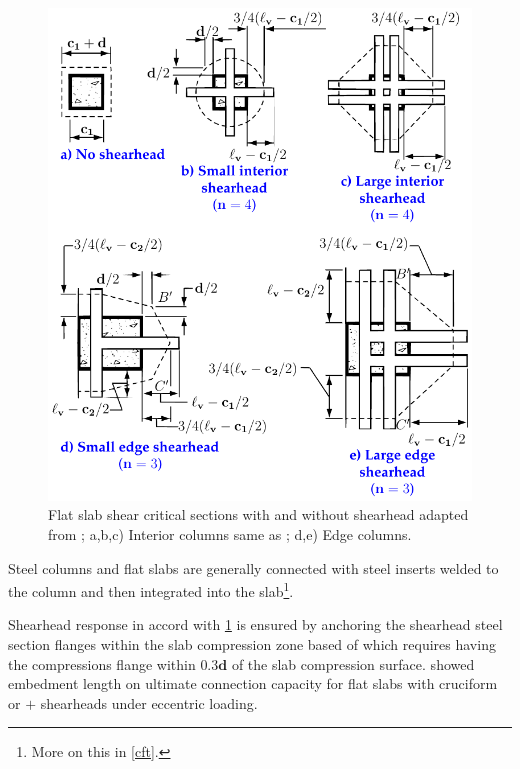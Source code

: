 \documentclass[twocolumn]{article} %
\begin{document}
\begin{figure}\centering
\includegraphics[width=\columnwidth]{Figures/tikzout/fr2269814.pdf}
\caption{Flat slab shear critical sections with and without shearhead adapted from \cite{ACI31814}; a,b,c) Interior columns same as \cite{hawkins1974a}; d,e) Edge columns.}\label{fr2269814}
\end{figure}
Steel columns and flat slabs are generally connected with steel inserts welded to the column and then integrated into the slab\footnote{More on this in \ref{cft}.}.

Shearhead response in accord with \ref{fr2269814} is ensured by anchoring the shearhead steel section flanges within the slab compression zone based of which \cite{aci31871} requires having the compressions flange within $0.3\mathbf{d}$ of the slab compression surface. \cite{godycki1984} showed embedment length on ultimate connection capacity for flat slabs with cruciform or $+$ shearheads under eccentric loading.
\end{document}
